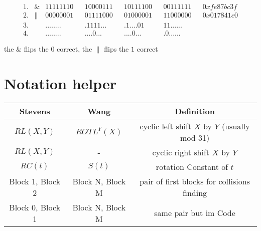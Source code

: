 \begin{align*}    
    1.& \& & 11111110& &10000111& &10111100& &00111111& &0xfe87bc3f \\
    2.& \| & 00000001& &01111000& &01000001& &11000000& &0x017841c0 \\
    3.&    & ........& &.1111...& &.1....01& &11......& & \\
    4.&    & ........& &....0...& &....0...& &.0......& & 
\end{align*}

  the $\&$ flips the $0$ correct, the $\|$ flips the $1$ correct


  \newpage

\section{Notation helper}


\begin{table}[]
    \begin{tabular}{ c | c | c }
    Stevens & Wang  & Definition  \\
    \hline 
    $ RL \left(X , Y \right) $  & $ ROTL^{Y} \left( X\right) $  & cyclic left shift $X$ by $Y$ (usually mod 31) \\
    $ RL \left(X , Y \right) $  & -                             & cyclic right shift $X$ by $Y$  \\
    $ RC \left(t \right) $      &$ S \left(t \right) $          & rotation Constant of $t$ \\
    Block 1, Block 2 & Block N, Block M & pair of first blocks for collisions finding   \\
    Block 0, Block 1 & Block N, Block M & same pair but im Code\\
    \end{tabular}
\end{table}


